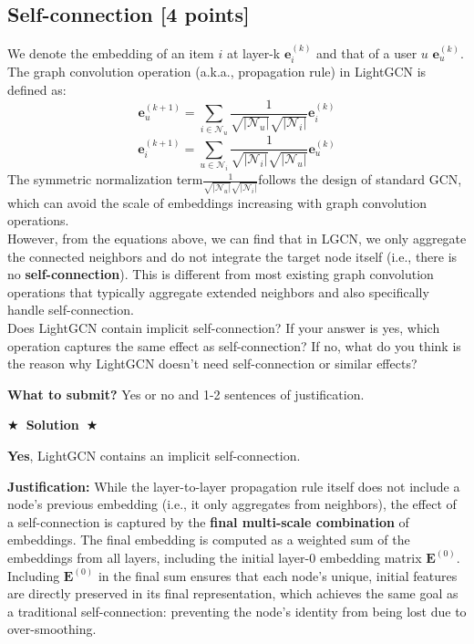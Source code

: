 \documentclass{article}
\numberwithin{figure}{section}
\newcommand{\Solution}[1]{%
    {%
        \medskip
        \color{red}
        \bf $\bigstar$~\sf\textbf{Solution}~$\bigstar$ \sf
        #1
    }
    \bigskip
}
\begin{document}
\subsection{Self-connection [4 points]}
We denote the embedding of an item $i$ at layer-k $\mathbf{e}_i^{(k)}$ and that of a user $u$ $\mathbf{e}_u^{(k)}$. The graph convolution operation (a.k.a., propagation rule) in LightGCN is defined as:
$$\mathbf{e}^{(k+1)}_u = \sum_{i\in\mathcal{N}_u}\frac{1}{\sqrt{\lvert\mathcal{N}_u\rvert}\sqrt{\lvert\mathcal{N}_i\rvert}}\mathbf{e}^{(k)}_i$$
$$\mathbf{e}^{(k+1)}_i = \sum_{u\in\mathcal{N}_i}\frac{1}{\sqrt{\lvert\mathcal{N}_i\rvert}\sqrt{\lvert\mathcal{N}_u\rvert}}\mathbf{e}^{(k)}_u$$  
The symmetric normalization term$\frac{1}{\sqrt{\lvert\mathcal{N}_u\rvert}\sqrt{\lvert\mathcal{N}_i\rvert}}$follows the design of standard GCN, which can avoid the scale of embeddings increasing with graph convolution operations.\\ 

\noindent However, from the equations above, we can find that in LGCN, we only aggregate the connected neighbors and do not integrate the target node itself (i.e., there is no \textbf{self-connection}). This is different from most existing graph convolution operations that typically aggregate extended neighbors and also specifically handle self-connection.\\

\noindent Does LightGCN contain implicit self-connection? If your answer is yes, which operation captures the same effect as self-connection? If no, what do you think is the reason why LightGCN doesn't need self-connection or similar effects?

\textbf{What to submit?} Yes or no and 1-2 sentences of justification.

\Solution{
	\textbf{Yes}, LightGCN contains an implicit self-connection.
	
	\textbf{Justification:}
	While the layer-to-layer propagation rule itself does not include a node's previous embedding (i.e., it only aggregates from neighbors), the effect of a self-connection is captured by the \textbf{final multi-scale combination} of embeddings. The final embedding is computed as a weighted sum of the embeddings from all layers, including the initial layer-0 embedding matrix $\mathbf{E}^{(0)}$. Including $\mathbf{E}^{(0)}$ in the final sum ensures that each node's unique, initial features are directly preserved in its final representation, which achieves the same goal as a traditional self-connection: preventing the node's identity from being lost due to over-smoothing.
}
\end{document}

